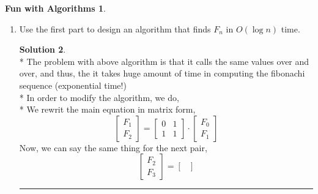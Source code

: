 \documentclass{article}
\theoremstyle{definition}
\newtheorem*{fun}{Fun with Algorithms}
\def\fline{\rule{0.75\linewidth}{0.5pt}}
\newcommand{\finishline}{\vspace{-15pt}\begin{center}\fline\end{center}}
\newtheorem*{solution*}{Solution}
\newenvironment{solution}{\begin{solution*}}{{\finishline} \end{solution*}}
\begin{document}
\begin{fun}
\begin{enumerate}[label=(\alph*)]
\begin{solution}
\[\begin{bmatrix}
			F_{n+1} + F_n & F_{n+1} \\
			F_{n} + F_{n-1} & F_{n}
		\end{bmatrix}
		=
	 	\begin{bmatrix}
			F_{n+2} & F_{n+1}\\
			F_{n+1} & F_{n}
		\end{bmatrix}
		\]
		We can say from fibonachi sequence that, \\*
		$F_{n+2} = F{n+1} + F_n$, and \\*
		$F_{n+1} = F{n} + F_{n-1}$ \\*
		Substituting those values, we get, 
		\[
	 	\begin{bmatrix}
			F_{n+2} & F_{n+1}\\
			F_{n+1} & F_{n}
		\end{bmatrix}
		=
	 	\begin{bmatrix}
			F_{n+2} & F_{n+1}\\
			F_{n+1} & F_{n}
		\end{bmatrix}
		\]
		Therefore, LHS = RHS \\*
		Hence, proved
		\end{solution}
		\item Use the first part to design an algorithm that finds $F_n$ in $O(\log{n})$ time. 
		\begin{solution}
		\hfill \bigskip\\*
		The problem with above algorithm is that it calls the same values over and over, and thus, the it takes huge amount of time in computing the fibonachi sequence (exponential time!) \\*
		In order to modify the algorithm, we do, \\*
		We rewrit the main equation in matrix form,
		\[
	 	\begin{bmatrix}
			F_{1} \\
			F_{2} 
		\end{bmatrix}
		=
		\begin{bmatrix}
			0 & 1 \\
			1 & 1
		\end{bmatrix}
		\cdot
	 	\begin{bmatrix}
			F_{0} \\
			F_{1}
		\end{bmatrix}
		\]
		Now, we can say the same thing for the next pair,
		\[
	 	\begin{bmatrix}
			F_{2} \\
			F_{3} 
		\end{bmatrix}
		=
		\begin{bmatrix}

\end{bmatrix}\]
\end{solution}
\end{enumerate}
\end{fun}
\end{document}
